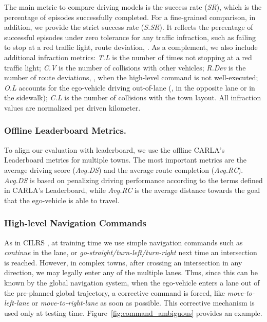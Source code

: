 The main metric to compare driving models is the success rate (\emph{SR}), which is the percentage of episodes successfully completed. 
For a fine-grained comparison, in addition, we provide the strict success rate (\emph{S.SR}). 
It reflects the percentage of successful episodes under zero tolerance for any traffic infraction, such as failing to stop at a red traffic light, route deviation, {\etc}. 
As a complement, we also include additional infraction metrics: \emph{T.L} is the number of times not stopping at a red traffic light; 
\emph{C.V} is the number of collisions with other vehicles; 
\emph{R.Dev} is the number of route deviations, {\ie}, when the high-level command is not well-executed; 
\emph{O.L} accounts for the ego-vehicle driving out-of-lane ({\eg}, in the opposite lane or in the sidewalk); 
\emph{C.L} is the number of collisions with the town layout. 
All infraction values are normalized per driven kilometer.


\subsubsection{Offline Leaderboard Metrics.}\label{lb_metrics}
\hspace{1pc}To align our evaluation with leaderboard\cite{Hu:2022}, we use the offline CARLA's Leaderboard metrics for multiple towns. 
The most important metrics are the average driving score (\emph{Avg.DS}) and the average route completion (\emph{Avg.RC}). 
\emph{Avg.DS} is based on penalizing driving performance according to the terms defined in CARLA's Leaderboard, 
while \emph{Avg.RC} is the average distance towards the goal that the ego-vehicle is able to travel.


\subsubsection{High-level Navigation Commands} 
\hspace{1pc}As in CILRS \cite{Codevilla:2019}, at training time we use simple navigation commands such as \emph{continue} in the lane, or \emph{go-straight/turn-left/turn-right} next time an intersection is reached. 
However, in complex towns, after crossing an intersection in any direction, we may legally enter any of the multiple lanes. 
Thus, since this can be known by the global navigation system, when the ego-vehicle enters a lane out of the pre-planned global trajectory, a corrective command is forced, like \emph{move-to-left-lane} or  \emph{move-to-right-lane} as soon as possible. 
This corrective mechanism is used only at testing time. 
Figure~\ref{fig:command_ambiguous} provides an example.

